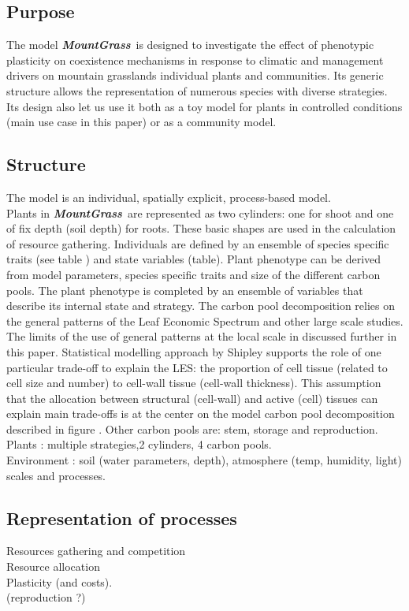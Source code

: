 \documentclass[review]{elsarticle}
\newcommand{\model}{\textbf{\textit{MountGrass}}~}
\begin{document}
\subsection{Purpose}
The model \model is designed to investigate the effect of phenotypic plasticity on coexistence mechanisms in response to climatic and management drivers on mountain grasslands individual plants and communities. Its generic structure allows the representation of numerous species with diverse strategies. Its design also let us use it both as a toy model for plants in controlled conditions (main use case in this paper) or as a community model.\\

\subsection{Structure}
The model is an individual, spatially explicit, process-based model.\\
Plants in \model are represented as two cylinders: one for shoot and one of fix depth (soil depth) for roots. These basic shapes are used in the calculation of resource gathering. Individuals are defined by an ensemble of species specific traits (see table ) and state variables (table). Plant phenotype can be derived from model parameters, species specific traits and size of the different carbon pools. The plant phenotype is completed by an ensemble of variables that describe its internal state and strategy. The carbon pool decomposition relies on the general patterns of the Leaf Economic Spectrum and other large scale studies. The limits of the use of general patterns at the local scale in discussed further in this paper. Statistical modelling approach by Shipley supports the role of one particular trade-off to explain the LES: the proportion of cell tissue (related to cell size and number) to cell-wall tissue (cell-wall thickness). This assumption that the allocation between structural (cell-wall) and active (cell) tissues can explain main trade-offs is at the center on the model carbon pool decomposition described in figure . Other carbon pools are: stem, storage and reproduction. %
Plants : multiple strategies,2 cylinders, 4 carbon pools.\\
Environment : soil (water parameters, depth), atmosphere (temp, humidity, light)\\
scales and processes.

\subsection{Representation of processes}
Resources gathering and competition\\
Resource allocation\\
Plasticity (and costs).\\
(reproduction ?)\\
\end{document}
